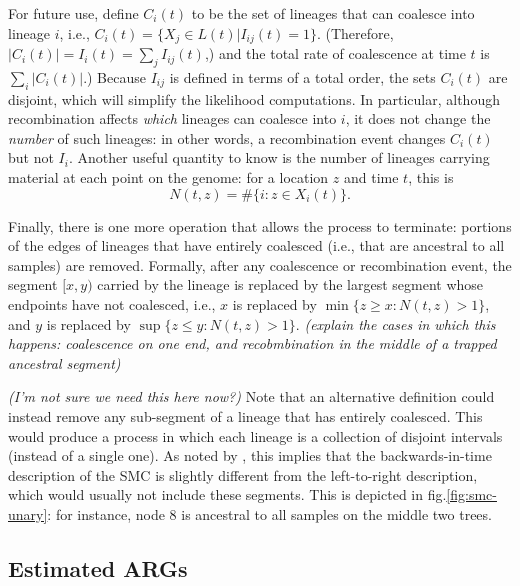 \documentclass{article}
\newcommand{\comment}[1]{{\it \color{orange} (#1)}}
\begin{document}
For future use, define $C_i(t)$ to be the set of lineages that can coalesce into lineage $i$,
i.e., $C_i(t) = \{X_j \in L(t) | I_{ij}(t) = 1\}$.
(Therefore, $|C_i(t)| = I_{i}(t) = \sum_{j} I_{ij}(t)$,)
and the total rate of coalescence at time $t$ is $\sum_{i} |C_i(t)|$.) 
Because $I_{ij}$ is defined in terms of a total order, the sets $C_i(t)$ are disjoint,
which will simplify the likelihood computations.
In particular,
although recombination affects \emph{which} lineages can coalesce into $i$,
it does not change the \emph{number} of such lineages:
in other words, a recombination event changes $C_i(t)$ but not $I_{i}$.
Another useful quantity to know is the number of lineages carrying material
at each point on the genome:
for a location $z$ and time $t$, this is
\begin{equation}
    N(t,z) = \#\{i : z \in X_i(t) \} .
\end{equation}

Finally, there is one more operation that allows the process to terminate:
portions of the edges of lineages that have entirely coalesced
(i.e., that are ancestral to all samples) are removed.
Formally, after any coalescence or recombination event,
the segment $[x,y)$ carried by the lineage
is replaced by the largest segment whose endpoints have not coalesced,
i.e., $x$ is replaced by $\min\{ z \ge x : N(t,z) > 1\}$,
and $y$ is replaced by $\sup\{ z \le y : N(t,z) > 1\}$.
\comment{explain the cases in which this happens: coalescence on one end,
and recobmbination in the middle of a trapped ancestral segment}

\comment{I'm not sure we need this here now?}
Note that 
an alternative definition could instead remove any sub-segment of a lineage
that has entirely coalesced.
This would produce a process in which each lineage is a collection
of disjoint intervals (instead of a single one).
As noted by \cite{mcvean_approximating_2005},
this implies that the backwards-in-time description of the
SMC is slightly different from the left-to-right description,
which would usually not include these segments.
This is depicted in fig.\ref{fig:smc-unary}:
for instance, node 8 is ancestral to all samples on the middle two trees.

\subsection{Estimated ARGs} \label{par:recording}
\end{document}
